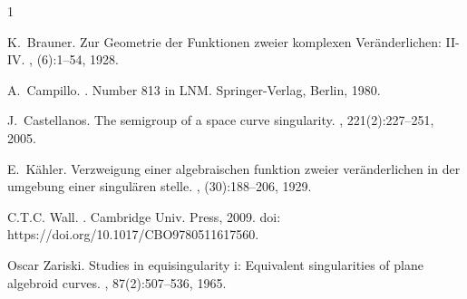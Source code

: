 \documentclass[a4paper,10pt]{amsart}
\begin{document}
\begin{thebibliography}{1}

K.~Brauner.
\newblock Zur {G}eometrie der {F}unktionen zweier komplexen {V}eränderlichen:
  {II-IV}.
, (6):1--54, 1928.

A.~Campillo.
.
\newblock Number 813 in LNM. Springer-Verlag, Berlin, 1980.

J.~Castellanos.
\newblock The semigroup of a space curve singularity.
, 221(2):227--251, 2005.

E.~K{\"a}hler.
\newblock Verzweigung einer algebraischen funktion zweier ver{\"a}nderlichen in
  der umgebung einer singul{\"a}ren stelle.
, (30):188--206, 1929.

C.T.C. Wall.
.
\newblock Cambridge Univ. Press, 2009.
\newblock doi: https://doi.org/10.1017/CBO9780511617560.

Oscar Zariski.
\newblock Studies in equisingularity i: Equivalent singularities of plane
  algebroid curves.
, 87(2):507--536, 1965.

\end{thebibliography}
\end{document}
